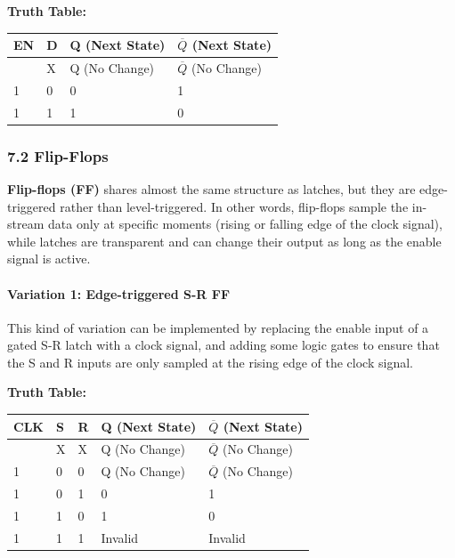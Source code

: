 \documentclass[
  a4paper,
]{article}
\begin{document}
\textbf{Truth Table:}

\begin{longtable}[]{@{}llll@{}}
\toprule\noalign{}
EN & D & Q (Next State) & \(\overline{Q}\) (Next State) \\
\midrule\noalign{}
\endhead
\bottomrule\noalign{}
\endlastfoot
0 & X & Q (No Change) & \(\overline{Q}\) (No Change) \\
1 & 0 & 0 & 1 \\
1 & 1 & 1 & 0 \\
\end{longtable}

\subsubsection{7.2 Flip-Flops}\label{flip-flops}

\textbf{Flip-flops (FF)} shares almost the same structure as latches,
but they are edge-triggered rather than level-triggered. In other words,
flip-flops sample the in-stream data only at specific moments (rising or
falling edge of the clock signal), while latches are transparent and can
change their output as long as the enable signal is active.

\paragraph{Variation 1: Edge-triggered S-R
FF}\label{variation-1-edge-triggered-s-r-ff}

This kind of variation can be implemented by replacing the enable input
of a gated S-R latch with a clock signal, and adding some logic gates to
ensure that the S and R inputs are only sampled at the rising edge of
the clock signal.

\textbf{Truth Table:}

\begin{longtable}[]{@{}lllll@{}}
\toprule\noalign{}
CLK & S & R & Q (Next State) & \(\overline{Q}\) (Next State) \\
\midrule\noalign{}
\endhead
\bottomrule\noalign{}
\endlastfoot
0 & X & X & Q (No Change) & \(\overline{Q}\) (No Change) \\
1 & 0 & 0 & Q (No Change) & \(\overline{Q}\) (No Change) \\
1 & 0 & 1 & 0 & 1 \\
1 & 1 & 0 & 1 & 0 \\
1 & 1 & 1 & Invalid & Invalid \\
\end{longtable}
\end{document}

